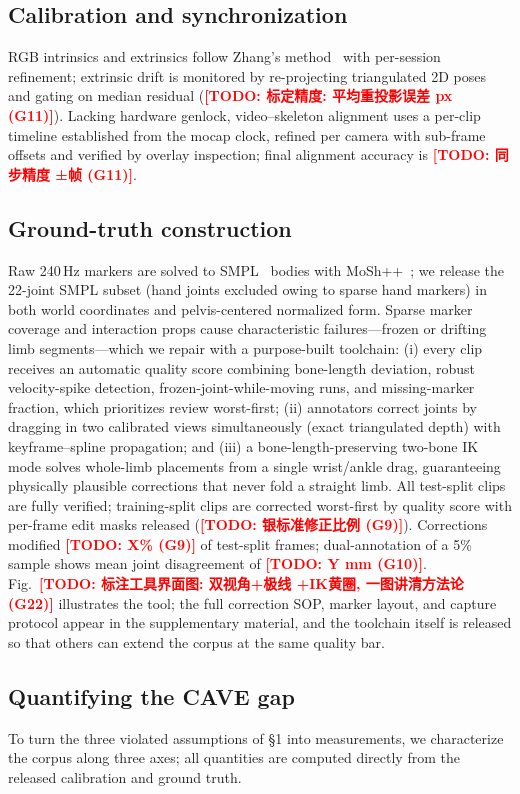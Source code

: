 \documentclass[10pt,twocolumn,letterpaper]{article}
\newcommand{\todocjkfont}{}
\newif\iftodos \todostrue   %
\newcommand{\todo}[1]{\iftodos\textcolor{red}{\textbf{[TODO: {\todocjkfont #1}]}}\fi}
\begin{document}
\subsection{Calibration and synchronization}
RGB intrinsics and extrinsics follow Zhang's method~\cite{zhang1999calib}
with per-session refinement; extrinsic drift is monitored by
re-projecting triangulated 2D poses and gating on median residual
(\todo{标定精度: 平均重投影误差 px (G11)}). Lacking hardware genlock,
video--skeleton alignment uses a per-clip timeline established from the
mocap clock, refined per camera with sub-frame offsets and verified by
overlay inspection; final alignment accuracy is \todo{同步精度 ±帧 (G11)}.

\subsection{Ground-truth construction}
Raw 240\,Hz markers are solved to SMPL~\cite{loper2015smpl} bodies with
MoSh++~\cite{mahmood2019amass}; we release the 22-joint SMPL subset
(hand joints excluded owing to sparse hand markers) in both world
coordinates and pelvis-centered normalized form. Sparse marker coverage
and interaction props cause characteristic failures---frozen or drifting
limb segments---which we repair with a purpose-built toolchain: (i) every
clip receives an automatic quality score combining bone-length deviation,
robust velocity-spike detection, frozen-joint-while-moving runs, and
missing-marker fraction, which prioritizes review worst-first;
(ii) annotators correct joints by dragging in two calibrated views
simultaneously (exact triangulated depth) with keyframe--spline
propagation; and (iii) a bone-length-preserving two-bone IK mode solves
whole-limb placements from a single wrist/ankle drag, guaranteeing
physically plausible corrections that never fold a straight limb. All
test-split clips are fully verified; training-split clips are corrected
worst-first by quality score with per-frame edit masks released
(\todo{银标准修正比例 (G9)}). Corrections modified \todo{X\% (G9)} of
test-split frames; dual-annotation of a 5\% sample shows mean joint
disagreement of \todo{Y mm (G10)}. Fig.~\todo{标注工具界面图: 双视角+极线
+IK黄圈, 一图讲清方法论 (G22)} illustrates the tool; the full correction
SOP, marker layout, and capture protocol appear in the supplementary
material, and the toolchain itself is released so that others can extend
the corpus at the same quality bar.

\subsection{Quantifying the CAVE gap}
\label{sec:gap}
To turn the three violated assumptions of \S1 into measurements, we
characterize the corpus along three axes; all quantities are computed
directly from the released calibration and ground truth.
\end{document}
